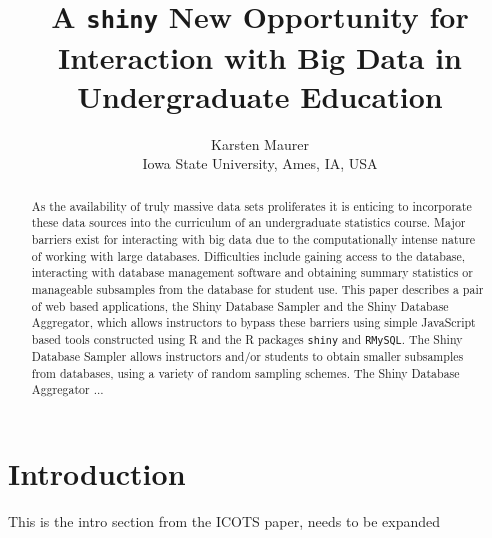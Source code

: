 \documentclass{article}\usepackage[]{graphicx}\usepackage[]{color}
\newcommand{\km}[1]{{\color{Orange} #1}}
\begin{document}
\tableofcontents
\newpage





\title{A \texttt{shiny} New Opportunity for Interaction with Big Data in Undergraduate Education}
\author{Karsten Maurer \\ Iowa State University, Ames, IA, USA}

\maketitle



 \begin{abstract}
As the availability of truly massive data sets proliferates it is enticing to incorporate these data sources into the curriculum of an undergraduate statistics course.  Major barriers exist for interacting with big data due to the computationally intense nature of working with large databases.  Difficulties include gaining access to the database, interacting with database management software and obtaining summary statistics or manageable subsamples from the database for student use.  This paper describes a pair of web based applications, the Shiny Database Sampler and the Shiny Database Aggregator, which allows instructors to bypass these barriers using simple JavaScript based tools constructed using R and the R packages \texttt{shiny} and \texttt{RMySQL}. The Shiny Database Sampler allows instructors and/or students to obtain smaller subsamples from databases, using a variety of random sampling schemes. The Shiny Database Aggregator ...
 \end{abstract}

\section{Introduction}

\km{This is the intro section from the ICOTS paper, needs to be expanded}\\
\end{document}
